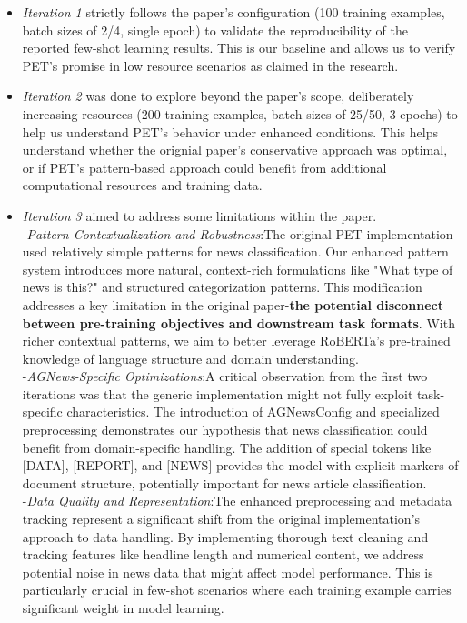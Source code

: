 \documentclass[11pt,a4paper]{article}
\begin{document}
\begin{itemize}[topsep=0pt]
  \item \textit{Iteration 1} strictly follows the paper's configuration (100 training examples, batch sizes of 2/4, single epoch) to validate the reproducibility of the reported few-shot learning results. This is our baseline and allows us to verify PET's promise in low resource scenarios as claimed in the research.
  \item \textit{Iteration 2} was done to explore beyond the paper's scope, deliberately increasing resources (200 training examples, batch sizes of 25/50, 3  epochs) to help us understand PET's behavior under enhanced conditions. This helps understand whether the orignial paper's conservative approach was optimal, or if PET's pattern-based approach could benefit from additional computational resources and training data.
  \item \textit{Iteration 3} aimed to address some limitations within the paper. \\
  -\textit{Pattern Contextualization and Robustness}:The original PET implementation used relatively simple patterns for news classification. Our enhanced pattern system introduces more natural, context-rich formulations like "What type of news is this?" and structured categorization patterns. This modification addresses a key limitation in the original paper-\textbf{the potential disconnect between pre-training objectives and downstream task formats}. With richer contextual patterns, we aim to better leverage RoBERTa's pre-trained knowledge of language structure and domain understanding.\\
  -\textit{AGNews-Specific Optimizations}:A critical observation from the first two iterations was that the generic implementation might not fully exploit task-specific characteristics. The introduction of AGNewsConfig and specialized preprocessing demonstrates our hypothesis that news classification could benefit from domain-specific handling. The addition of special tokens like [DATA], [REPORT], and [NEWS] provides the model with explicit markers of document structure, potentially important for news article classification.\\
  -\textit{Data Quality and Representation}:The enhanced preprocessing and metadata tracking represent a significant shift from the original implementation's approach to data handling. By implementing thorough text cleaning and tracking features like headline length and numerical content, we address potential noise in news data that might affect model performance. This is particularly crucial in few-shot scenarios where each training example carries significant weight in model learning.\\

\end{itemize}
\end{document}
